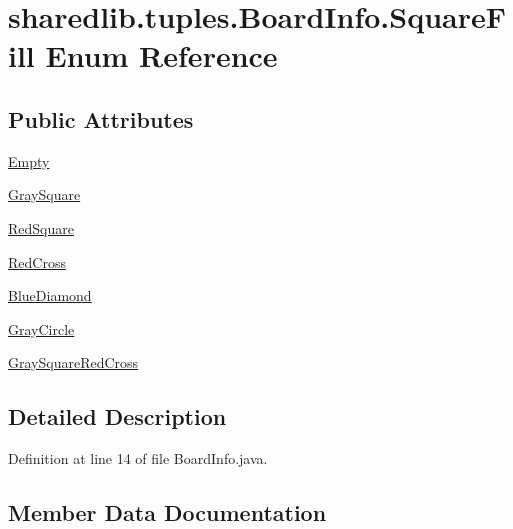 \hypertarget{enumsharedlib_1_1tuples_1_1_board_info_1_1_square_fill}{}\section{sharedlib.\+tuples.\+Board\+Info.\+Square\+Fill Enum Reference}
\label{enumsharedlib_1_1tuples_1_1_board_info_1_1_square_fill}
\subsection*{Public Attributes}
\begin{DoxyCompactItemize}
\item 
\hyperlink{enumsharedlib_1_1tuples_1_1_board_info_1_1_square_fill_a3b74fd396b72ace18187bde81bd4d658}{Empty}
\item 
\hyperlink{enumsharedlib_1_1tuples_1_1_board_info_1_1_square_fill_ac2c105522cda643298ac9c80209f28de}{Gray\+Square}
\item 
\hyperlink{enumsharedlib_1_1tuples_1_1_board_info_1_1_square_fill_a55b8ce021c2e15b5edc7da5ec8204c92}{Red\+Square}
\item 
\hyperlink{enumsharedlib_1_1tuples_1_1_board_info_1_1_square_fill_aa9a2d707736eeba8ad5b23cc21ca8c1d}{Red\+Cross}
\item 
\hyperlink{enumsharedlib_1_1tuples_1_1_board_info_1_1_square_fill_a0ee6cacb83732fc5190ee2feffab7208}{Blue\+Diamond}
\item 
\hyperlink{enumsharedlib_1_1tuples_1_1_board_info_1_1_square_fill_a9b039fababbc4e9c5efb6fb0c9529121}{Gray\+Circle}
\item 
\hyperlink{enumsharedlib_1_1tuples_1_1_board_info_1_1_square_fill_a98d84dff30d9ea103819323197f896a0}{Gray\+Square\+Red\+Cross}
\end{DoxyCompactItemize}


\subsection{Detailed Description}


Definition at line 14 of file Board\+Info.\+java.



\subsection{Member Data Documentation}
\hypertarget{enumsharedlib_1_1tuples_1_1_board_info_1_1_square_fill_a0ee6cacb83732fc5190ee2feffab7208}{}\label{enumsharedlib_1_1tuples_1_1_board_info_1_1_square_fill_a0ee6cacb83732fc5190ee2feffab7208} 
